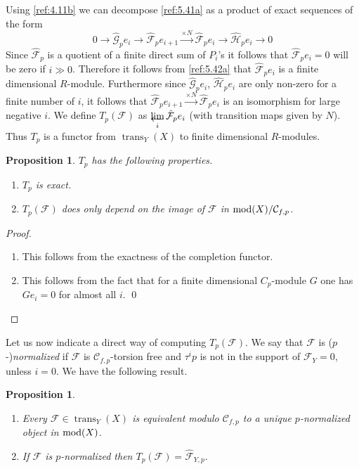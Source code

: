 \documentclass{amsproc}
\def\Cscr{{\mathcal C}}
\def\Fscr{{\mathcal F}}
\def\Gscr{{\mathcal G}}
\def\Hscr{{\mathcal H}}
\def\mod{\mathop{\text{mod}}}
\def\trans{\operatorname{trans}}
\def\r{\rightarrow}
\let\oldtext\text
\def\text#1{\oldtext{\upshape #1}}
\let\invlim\projlim
\newtheorem{propositions}[lemmas]{Proposition}
\theoremstyle{definition}
\theoremstyle{remark}
\def\invlim{\mathop{\vtop{\baselineskip -100pt\lineskip -1pt\lineskiplimit 0pt
\setbox0\hbox{\upshape lim}\copy0\hbox to \wd0{\leftarrowfill}}}\limits}
\numberwithin{equation}{section}
\numberwithin{table}{section}
\numberwithin{figure}{section}
\begin{document}
Using \eqref{ref:4.11b} we can decompose
\eqref{ref:5.41a} as a product of exact sequences of the form
\begin{equation}
\label{ref:5.42a}
0\r \hat{\Gscr}_pe_i\r \hat{\Fscr}_p e_{i+1}\xrightarrow{\times N}
\hat{\Fscr}_p e_i 
\r \hat{\Hscr}_p e_i\r 0
\end{equation}
Since $\hat{\Fscr}_p$ is a quotient of a finite direct sum of $P_i$'s
it follows that $\hat{\Fscr}_p e_i=0 $ will be zero if $i\gg 0$.
Therefore it follows from \eqref{ref:5.42a} that $\hat{\Fscr}_p e_i$ is a
finite dimensional $R$-module.  Furthermore since $\hat{\Gscr}_pe_i$,
$\hat{\Hscr}_pe_i$ are only non-zero for a finite number of $i$, it
follows that $ \hat{\Fscr}_p e_{i+1}\xrightarrow{\times N}
\hat{\Fscr}_p e_i $ is an isomorphism for large negative $i$. We
define $T_p(\Fscr)$ as $\invlim_{i} \hat{\Fscr}_pe_i$ (with transition
maps given by $N$). Thus $T_p$ is a functor from $\trans_Y(X)$ to
finite dimensional $R$-modules.
\begin{propositions}
$T_p$ has the following properties. 
\begin{enumerate}
\item $T_p$ is exact.
\item $T_p(\Fscr)$ does only depend on the image of $\Fscr$ in
  $\mod(X)/\Cscr_{f,p}$.
\end{enumerate}
\end{propositions}
\begin{proof}
\begin{enumerate}
\item This follows from the exactness of the completion functor.
\item
This follows from the fact that for a finite dimensional $C_p$-module
$G$ one has $Ge_i=0$ for almost all $i$. \qed 
\end{enumerate}
\def\qed{}\end{proof} Let us now indicate a direct way of computing
$T_p(\Fscr)$. We say that $\Fscr$ is \mbox{($p$-)\emph{normalized}} if
$\Fscr$ is $\Cscr_{f,p}$-torsion free and $\tau^ip$ is not in the
support of $\Fscr_Y=0$, unless $i=0$. We have the following result.
\begin{propositions}
\label{ref:5.7.2a}
\begin{enumerate}
\item Every $\Fscr\in \trans_Y(X)$ is equivalent modulo $\Cscr_{f,p}$
  to a unique $p$-normalized object in $\mod(X)$.
\item If $\Fscr$ is $p$-normalized then
  $T_p(\Fscr)=\hat{\Fscr}_{Y,p}$. 
\end{enumerate}
\end{propositions}
\end{document}
